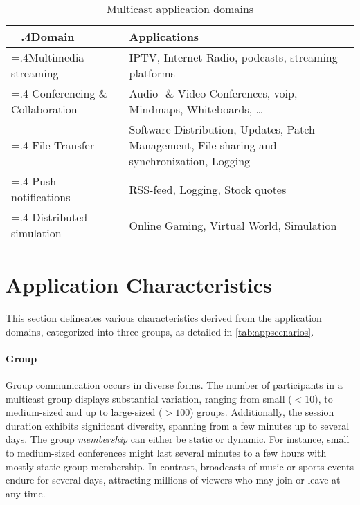 
\begin{table}[h]
    \centering
    \begin{tabularx}{\textwidth}{>{\hsize=.4\hsize}XX}
    \toprule
        \textbf{Domain} & \textbf{Applications} \\
    \midrule
        Multimedia streaming &
        IPTV, Internet Radio, podcasts, streaming platforms
        \\\addlinespace
        Conferencing \& Collaboration &
        Audio- \& Video-Conferences, \gls{voip}, Mindmaps, Whiteboards, \dots
        \\\addlinespace
        File Transfer &
        Software Distribution, Updates, Patch Management, File-sharing and
            -synchronization, Logging
        \\\addlinespace
        Push notifications &
        RSS-feed, Logging, Stock quotes
        \\\addlinespace
        Distributed simulation &
        Online Gaming, Virtual World, Simulation \\

    \bottomrule
    \end{tabularx}
    \caption{Multicast application domains}
    \label{tab:mcappdom}
\end{table}

\section{Application Characteristics} %
\label{sec:Application Characteristics}
This section delineates various characteristics derived from the application
    domains, categorized into three groups, as detailed in
    \autoref{tab:appscenarios}.
\paragraph{Group} %
\label{par:Group}
Group communication occurs in diverse forms.
The number of participants in a multicast group displays substantial variation,
    ranging from small ($<10$), to medium-sized and up to large-sized ($>100$)
    groups.
Additionally, the session duration exhibits significant diversity, spanning
    from a few minutes up to several days.
The group \textit{membership} can either be static or dynamic.
For instance, small to medium-sized conferences might last several minutes
    to a few hours with mostly static group membership.
In contrast, broadcasts of music or sports events endure for several days,
    attracting millions of viewers who may join or leave at any time.

